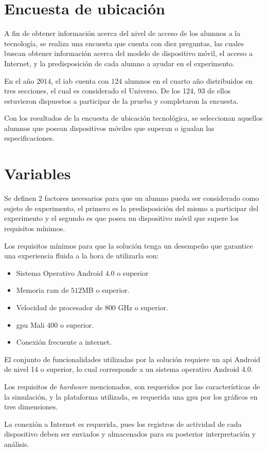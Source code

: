 
\section{Encuesta de ubicación}
\label{sec:ubicacion}

A fin de obtener información acerca del nivel de acceso  de los alumnos a la
tecnología, se realiza una encuesta que cuenta con diez preguntas, las cuales
buscan obtener información acerca del modelo de dispositivo móvil, el acceso a
Internet, y la predisposición de cada alumno a ayudar en el experimento.

En el año $2014$, el \Gls{iab} cuenta con $124$ alumnos en el cuarto año distribuidos en
tres secciones, el cual es considerado el Universo. De los 124, 93 de
ellos estuvieron dispuestos a participar de la prueba y completaron la encuesta.

Con los resultados de la encuesta de ubicación tecnológica, se seleccionan
aquellos alumnos que posean dispositivos móviles que superan o igualan las
especificaciones.


\section{Variables}

Se definen $2$ factores necesarios para que un alumno pueda ser considerado como
sujeto de experimento, el primero es la predisposición del mismo a participar
del experimento y el segundo es que posea un dispositivo móvil que supere los
requisitos mínimos.

Los requisitos mínimos para que la solución tenga un desempeño que garantice una
experiencia fluida a la hora de utilizarla son:

\begin{itemize}
    \item Sistema Operativo Android $4.0$ o superior
    \item Memoria ram de $512$MB o superior.
    \item Velocidad de procesador de $800$ GHz o superior.
    \item \Gls{gpu} Mali 400 o superior.
    \item Conexión frecuente a internet.
\end{itemize}

El conjunto de funcionalidades utilizadas por la solución requiere un \Gls{api}
Android de nivel 14\cite{android:api} o superior, lo cual corresponde a un
sistema operativo Android 4.0.

Los requisitos de \textit{hardware} mencionados, son requeridos por las
características de la simulación, y la plataforma utilizada, es requerida una
\Gls{gpu} por los gráficos en tres dimensiones.

La conexión a Internet es requerida, pues los registros de actividad de cada
dispositivo deben ser enviados y almacenados para su posterior interpretación y
análisis.

